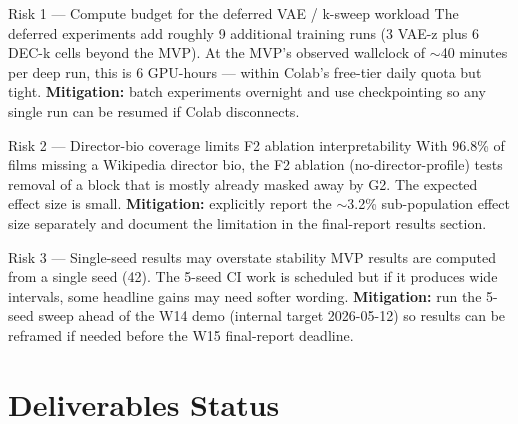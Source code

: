 \documentclass[11pt,a4paper]{article}
\begin{document}
\begin{riskbox}{Risk 1 --- Compute budget for the deferred VAE / k-sweep workload}
The deferred experiments add roughly 9 additional training runs (3 VAE-z plus 6 DEC-k cells beyond the MVP). At the MVP's observed wallclock of $\sim$40 minutes per deep run, this is 6 GPU-hours --- within Colab's free-tier daily quota but tight. \textbf{Mitigation:} batch experiments overnight and use checkpointing so any single run can be resumed if Colab disconnects.
\end{riskbox}

\begin{riskbox}{Risk 2 --- Director-bio coverage limits F2 ablation interpretability}
With 96.8\% of films missing a Wikipedia director bio, the F2 ablation (no-director-profile) tests removal of a block that is mostly already masked away by G2. The expected effect size is small. \textbf{Mitigation:} explicitly report the $\sim$3.2\% sub-population effect size separately and document the limitation in the final-report results section.
\end{riskbox}

\begin{riskbox}{Risk 3 --- Single-seed results may overstate stability}
MVP results are computed from a single seed (42). The 5-seed CI work is scheduled but if it produces wide intervals, some headline gains may need softer wording. \textbf{Mitigation:} run the 5-seed sweep ahead of the W14 demo (internal target 2026-05-12) so results can be reframed if needed before the W15 final-report deadline.
\end{riskbox}

\section{Deliverables Status}
\label{sec:deliverables}
\end{document}
